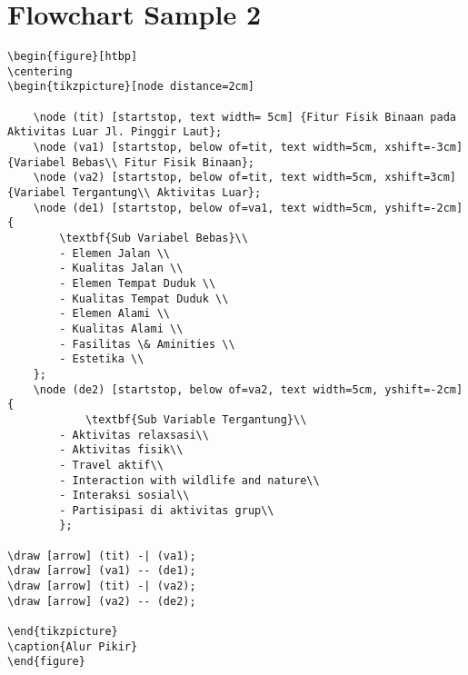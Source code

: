 \documentclass[12pt]{article}
\begin{document}
\section{Flowchart Sample 2 }
\begin{lstlisting}
\begin{figure}[htbp]
\centering
\begin{tikzpicture}[node distance=2cm]

	\node (tit) [startstop, text width= 5cm] {Fitur Fisik Binaan pada Aktivitas Luar Jl. Pinggir Laut};
	\node (va1) [startstop, below of=tit, text width=5cm, xshift=-3cm] {Variabel Bebas\\ Fitur Fisik Binaan};
	\node (va2) [startstop, below of=tit, text width=5cm, xshift=3cm] {Variabel Tergantung\\ Aktivitas Luar};
	\node (de1) [startstop, below of=va1, text width=5cm, yshift=-2cm] {
		\textbf{Sub Variabel Bebas}\\
		- Elemen Jalan \\
		- Kualitas Jalan \\
		- Elemen Tempat Duduk \\
		- Kualitas Tempat Duduk \\
		- Elemen Alami \\
		- Kualitas Alami \\
		- Fasilitas \& Aminities \\
		- Estetika \\
	};
	\node (de2) [startstop, below of=va2, text width=5cm, yshift=-2cm] {
			\textbf{Sub Variable Tergantung}\\
		- Aktivitas relaxsasi\\
		- Aktivitas fisik\\
		- Travel aktif\\
		- Interaction with wildlife and nature\\
		- Interaksi sosial\\
		- Partisipasi di aktivitas grup\\
		};

\draw [arrow] (tit) -| (va1);
\draw [arrow] (va1) -- (de1);
\draw [arrow] (tit) -| (va2);
\draw [arrow] (va2) -- (de2);

\end{tikzpicture}
\caption{Alur Pikir}
\end{figure}
\end{lstlisting}
\end{document}
